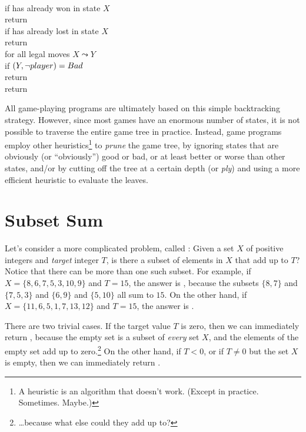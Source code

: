 \begin{pseudocode}
\\
if  has already won in state $X$\\
\Indent return \\
if  has already lost in state $X$\\
\Indent return \\
for all legal moves $X \leadsto Y$\\
\Indent if $(Y, \neg player) = Bad$\\
\Indent\Indent return  \\
return  
\end{pseudocode}

All game-playing programs are ultimately based on this simple backtracking strategy.
However, since most games have an enormous number of states, it is not possible to traverse the entire game tree in practice.
Instead, game programs employ other heuristics\footnote{A heuristic is an algorithm that doesn’t work. (Except in practice. Sometimes. Maybe.)} to \textit{prune} the game tree, by ignoring states that are obviously (or “obviously”) good or bad, or at least better or worse than other states, and/or by cutting off the tree at a certain depth (or \textit{ply}) and using a more efficient heuristic to evaluate the leaves.

\section{Subset Sum}
\label{sec:2.3}

Let’s consider a more complicated problem, called : Given a set $X$ of positive integers and \textit{target} integer $T$, is there a subset of elements in $X$ that add up to $T$?
Notice that there can be more than one such subset.
For example, if $X = \{8, 6, 7, 5, 3, 10, 9\}$ and $T = 15$, the answer is , because the subsets $\{8, 7\}$ and $\{7, 5, 3\}$ and $\{6, 9\}$ and $\{5, 10\}$ all sum to $15$.
On the other hand, if $X = \{11, 6, 5, 1, 7, 13, 12\}$ and $T = 15$, the answer is .

There are two trivial cases.
If the target value $T$ is zero, then we can immediately return , because the empty set is a subset of \textit{every} set $X$, and the elements of the empty set add up to zero.\footnote{\dots because what else could they add up to?}
On the other hand, if $T < 0$, or if $T \neq 0$ but the set $X$ is empty, then we can immediately return .

